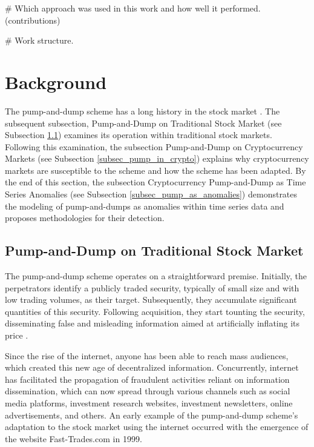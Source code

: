 \documentclass[12pt]{article}
\begin{document}
	\# Which approach was used in this work and how well it performed. (contributions)

	\# Work structure. 
	
	\section{Background}
	\label{sec_fund_teorica}

	The pump-and-dump scheme has a long history in the stock market \citep{lamorgia2020}.
	The subsequent subsection, Pump-and-Dump on Traditional Stock Market (see Subsection \ref{subsec_pump_def}) examines its operation within traditional stock markets.
	Following this examination, the subsection Pump-and-Dump on Cryptocurrency Markets (see Subsection \ref{subsec_pump_in_crypto}) explains why cryptocurrency markets are susceptible to the scheme and how the scheme has been adapted.
	By the end of this section, the subsection Cryptocurrency Pump-and-Dump as Time Series Anomalies (see Subsection \ref{subsec_pump_as_anomalies}) demonstrates the modeling of pump-and-dumps as anomalies within time series data and proposes methodologies for their detection.

	\subsection{Pump-and-Dump on Traditional Stock Market}
	\label{subsec_pump_def}

	The pump-and-dump scheme operates on a straightforward premise.
	Initially, the perpetrators identify a publicly traded security, typically of small size and with low trading volumes, as their target.
	Subsequently, they accumulate significant quantities of this security.
	Following acquisition, they start tounting the security, disseminating false and misleading information aimed at artificially inflating its price \citep{kramer2005}.

	Since the rise of the internet, anyone has been able to reach mass audiences, which created this new age of decentralized information.
	Concurrently, internet has facilitated the propagation of fraudulent activities reliant on information dissemination, which can now spread through various channels such as social media platforms, investment research websites, investment newsletters, online advertisements, and others.
	An early example of the pump-and-dump scheme's adaptation to the stock market using the internet occurred with the emergence of the website Fast-Trades.com in 1999.
\end{document}
